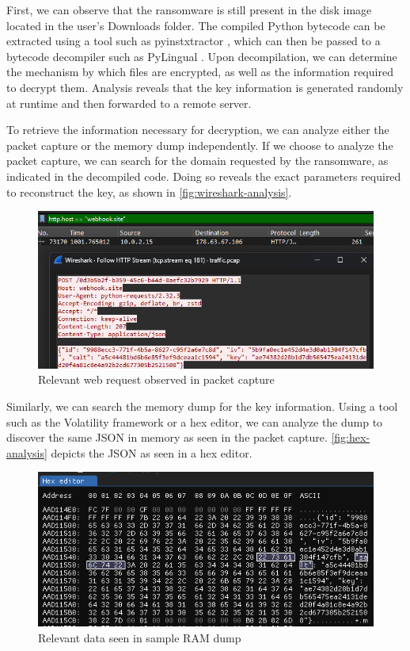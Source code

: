 \documentclass[final,5p,times,twocolumn]{elsarticle}
\begin{document}
First, we can observe that the ransomware is still present in the disk
image located in the user's Downloads folder. The compiled Python
bytecode can be extracted using a tool such as pyinstxtractor
\citep{extremecodersExtremecodersrePyinstxtractor2025}, which can
then be passed to a bytecode decompiler such as PyLingual
\citep{wiedemeierPYLINGUALPerfectDecompilation2024}. Upon
decompilation, we can determine the mechanism by which files are
encrypted, as well as the information required to decrypt them. Analysis
reveals that the key information is generated randomly at runtime and
then forwarded to a remote server.

To retrieve the information necessary for decryption, we can analyze
either the packet capture or the memory dump independently. If we choose
to analyze the packet capture, we can search for the domain requested by
the ransomware, as indicated in the decompiled code. Doing so reveals
the exact parameters required to reconstruct the key, as shown in
\autoref{fig:wireshark-analysis}.

\begin{figure}[htbp]
\centering
\includegraphics[width=1\linewidth]{wireshark-analysis.png}
\caption{Relevant web request observed in packet
capture}\label{fig:wireshark-analysis}
\end{figure}

Similarly, we can search the memory dump for the key information. Using
a tool such as the Volatility framework or a hex editor, we can analyze
the dump to discover the same JSON in memory as seen in the packet
capture. \autoref{fig:hex-analysis} depicts the JSON as seen in a hex
editor.

\begin{figure}[htbp]
\centering
\includegraphics[width=1\linewidth]{hex-analysis.png}
\caption{Relevant data seen in sample RAM dump}\label{fig:hex-analysis}
\end{figure}
\end{document}
